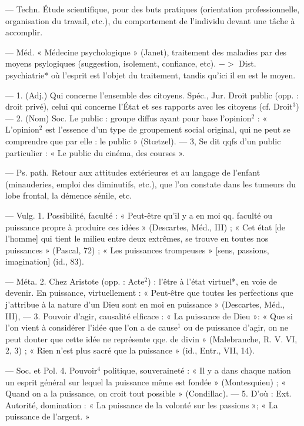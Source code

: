 \begin{itemize}[leftmargin=1cm, label=, itemsep=1pt]
 — Techn. Étude
scientifique, pour des buts pratiques
(orientation professionnelle, organisation du travail, etc.), du comportement de l'individu devant une
tâche à accomplir.

 — Méd. « Médecine
psychologique » (Janet), traitement
des maladies par des moyens psylogiques (suggestion, isolement, confiance, etc). $->$ Dist. psychiatrie*
où l'esprit est l’objet du traitement,
tandis qu'ici il en est le moyen.

 — 1. (Adj.) Qui concerne l’ensemble des citoyens. Spéc., Jur.
Droit public (opp. : droit privé),
celui qui concerne l'État et ses rapports avec les citoyens (cf. Droit$^3$)
— 2. (Nom) Soc. Le public : groupe
diffus ayant pour base l'opinion$^2$ :
« L'opinion$^2$ est l'essence d’un type
de groupement social original, qui ne
peut se comprendre que par elle : le
public » (Stœtzel). — 3, Se dit qqfs
d'un public particulier : « Le public
du cinéma, des courses ».

 — Ps. path. Retour aux
attitudes extérieures et au langage
de l'enfant (minauderies, emploi des
diminutifs, etc.), que l’on constate
dans les tumeurs du lobe frontal, la
démence sénile, etc.

 — Vulg. 1. Possibilité,
faculté : « Peut-être qu’il y a en moi
qq. faculté ou puissance propre à
produire ces idées » (Descartes,
Méd., III) ; « Cet état [de l’homme]
qui tient le milieu entre deux
extrêmes, se trouve en toutes nos
puissances » (Pascal, 72) ; « Les puissances trompeuses » [sens, passions,
imagination] (id., 83).

— Méta. 2. Chez Aristote (opp. :
Acte$^2$) : l'être à l’état virtuel*, en
voie de devenir. En puissance, virtuellement : « Peut-être que toutes
les perfections que j'attribue à la
nature d'un Dieu sont en moi en
puissance » (Descartes, Méd., III),
— 3. Pouvoir d'agir, causalité elficace : « La puissance de Dieu »:
« Que si l’on vient à considérer l’idée
que l'on a de cause$^1$ ou de puissance
d'agir, on ne peut douter que cette
idée ne représente qqe. de divin »
(Malebranche, R. V. VI, 2, 3) ;
« Rien n'est plus sacré que la puissance » (id., Entr., VII, 14).

— Soc. et Pol. 4. Pouvoir$^4$ politique, souveraineté : « Il y a dans
chaque nation un esprit général sur
lequel la puissance même est fondée »
(Montesquieu) ; « Quand on a la
puissance, on croit tout possible »
(Condillac). — 5. D'où : Ext. Autorité, domination : « La puissance de
la volonté sur les passions »; « La
puissance de l'argent. »


\end{itemize}
